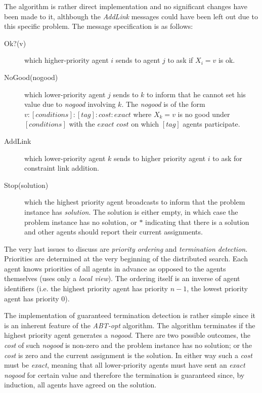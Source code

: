 \documentclass[11pt]{article}
\begin{document}
The algorithm is rather direct implementation and no significant changes have been made to it, althbough the \emph{AddLink} messages could have been left out due to this specific problem. The message specification is as follows:
\begin{description}
\item[Ok?(v)] which higher-priority agent $i$ sends to agent $j$ to ask if $X_i = v$ is ok.
\item[NoGood(nogood)] which lower-priority agent $j$ sends to $k$ to inform that he cannot set his value due to \emph{nogood} involving $k$. The \emph{nogood} is of the form $v:[conditions]:[tag]:cost:exact$ where $X_k = v$ is no good under $[conditions]$ with the $exact$ $cost$ on which $[tag]$ agents participate.
\item[AddLink] which lower-priority agent $k$ sends to higher priority agent $i$ to ask for constraint link addition.
\item[Stop(solution)] which the highest priority agent broadcasts to inform that the problem instance has \emph{solution}. The solution is either empty, in which case the problem instance has no solution, or $*$ indicating that there is a solution and other agents should report their current assignments.
\end{description}

The very last issues to discuss are \emph{priority ordering} and \emph{termination detection}. Priorities are determined at the very beginning of the distributed search. Each agent knows priorities of all agents in advance as opposed to the agents themselves (uses only a \emph{local view}). The ordering itself is an inverse of agent identifiers (i.e. the highest priority agent has priority $n-1$, the lowest priority agent has priority $0$).

The implementation of guaranteed termination detection is rather simple since it is an inherent feature of the \emph{ABT-opt} algorithm. The algorithm terminates if the highest priority agent generates a \emph{nogood}. There are two possible outcomes, the \emph{cost} of such \emph{nogood} is non-zero and the problem instance has no solution; or the \emph{cost} is zero and the current assignment is the solution. In either way such a \emph{cost} must be \emph{exact}, meaning that all lower-priority agents must have sent an \emph{exact} \emph{nogood} for certain value and therefore the termination is guaranteed since, by induction, all agents have agreed on the solution.



\end{document}
